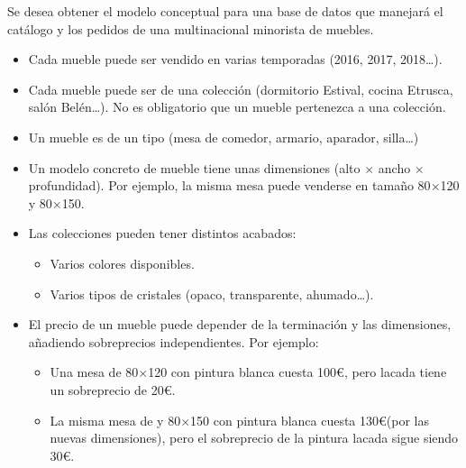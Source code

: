 Se desea obtener el modelo conceptual para una base de datos que manejará el catálogo y los pedidos de una multinacional minorista de muebles.
\begin{itemize}
\item Cada mueble puede ser vendido en varias temporadas (2016, 2017, 2018…).
\item Cada mueble puede ser de una colección (dormitorio Estival, cocina Etrusca, salón Belén…). No es obligatorio que un mueble pertenezca a una colección.
  
\item Un mueble es de un tipo (mesa de comedor, armario, aparador, silla\ldots)
\item Un modelo concreto de mueble tiene unas dimensiones (alto $\times$ ancho $\times$ profundidad). Por ejemplo, la misma mesa puede venderse en tamaño 80$\times$120 y 80$\times$150.
\item Las colecciones pueden tener distintos acabados:
  \begin{itemize}
  \item Varios colores disponibles.
  \item Varios tipos de cristales (opaco, transparente, ahumado…).
  \end{itemize}
\item El precio de un mueble puede depender de la terminación y las dimensiones, añadiendo sobreprecios independientes. Por ejemplo:
  \begin{itemize}
  \item Una mesa de 80$\times$120 con pintura blanca cuesta 100\euro, pero lacada tiene un sobreprecio de 20\euro.
  \item La misma mesa de y 80$\times$150 con pintura blanca cuesta 130\euro (por las nuevas dimensiones), pero el sobreprecio de la pintura lacada sigue siendo 30\euro.
  \end{itemize}
 
\end{itemize}


